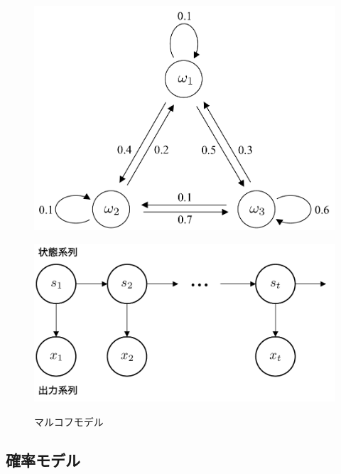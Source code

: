 \begin{figure}[htb]
	\centering
	\begin{minipage}[t]{.49\hsize}
		\centering
		\includegraphics[width=\hsize, bb=0 0 461 344]{./fig/hidden_markov_model/markov_model.pdf}
		\label{fig:markov:markovmodel1}
	\end{minipage}
	\begin{minipage}[t]{.5\hsize}
		\centering
		\includegraphics[width=\hsize, bb=0 0 551 289]{./fig/hidden_markov_model/markov_graph.pdf}
		\label{fig:markov:markovmodel2}
	\end{minipage}
	\caption{マルコフモデル}
	\label{fig:markov:markovmodel}
\end{figure}

\newpage
\subsection{確率モデル}

